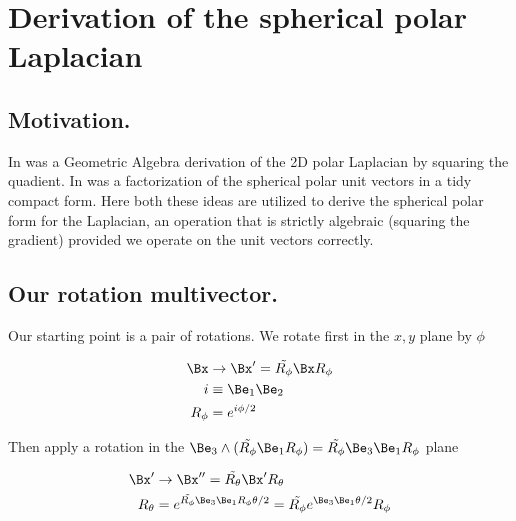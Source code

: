 
%

\chapter{Derivation of the spherical polar Laplacian}
\label{chap:sphericalPolarLaplacian}
{}
\date{Oct X, 2010}

\beginArtWithToc

\section{Motivation.}

In \cite{polarGradAndLaplacian} was a Geometric Algebra derivation of the 2D polar Laplacian by squaring the quadient.  In \cite{sphericalPolarUnit} was a factorization of the spherical polar unit vectors in a tidy compact form.  Here both these ideas are utilized to derive the spherical polar form for the Laplacian, an operation that is strictly algebraic (squaring the gradient) provided we operate on the unit vectors correctly.

\section{Our rotation multivector.}

Our starting point is a pair of rotations.  We rotate first in the $x,y$ plane by $\phi$

\begin{subequations}
\label{eqn:sphericalPolarLaplacian:101}
\begin{align}
\Bx &\rightarrow \Bx' = \tilde{R_\phi} \Bx R_\phi \\
i &\equiv \Be_1 \Be_2 \\
R_\phi &= e^{i \phi/2}
\end{align}
\end{subequations}

Then apply a rotation in the $\Be_3 \wedge (\tilde{R_\phi} \Be_1 R_\phi) = \tilde{R_\phi} \Be_3 \Be_1 R_\phi$ plane

\begin{subequations}
\label{eqn:sphericalPolarLaplacian:102}
\begin{align}
\Bx' &\rightarrow \Bx'' = \tilde{R_\theta} \Bx' R_\theta \\
R_\theta &= e^{ \tilde{R_\phi} \Be_3 \Be_1 R_\phi \theta/2 } = \tilde{R_\phi} e^{ \Be_3 \Be_1 \theta/2 } R_\phi
\end{align}
\end{subequations}

